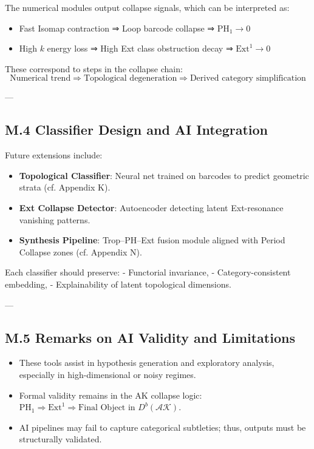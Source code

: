 \documentclass[11pt]{article}
\begin{document}
The numerical modules output collapse signals, which can be interpreted as:
\begin{itemize}
  \item Fast Isomap contraction ⇒ Loop barcode collapse ⇒ $\mathrm{PH}_1 \to 0$
  \item High $k$ energy loss ⇒ High Ext class obstruction decay ⇒ $\mathrm{Ext}^1 \to 0$
\end{itemize}

These correspond to steps in the collapse chain:
\[
\text{Numerical trend} \Rightarrow \text{Topological degeneration} \Rightarrow \text{Derived category simplification}
\]

---

\subsection*{M.4 Classifier Design and AI Integration}

Future extensions include:
\begin{itemize}
  \item \textbf{Topological Classifier}: Neural net trained on barcodes to predict geometric strata (cf. Appendix K).
  \item \textbf{Ext Collapse Detector}: Autoencoder detecting latent Ext-resonance vanishing patterns.
  \item \textbf{Synthesis Pipeline}: Trop–PH–Ext fusion module aligned with Period Collapse zones (cf. Appendix N).
\end{itemize}

Each classifier should preserve:
- Functorial invariance,
- Category-consistent embedding,
- Explainability of latent topological dimensions.

---

\subsection*{M.5 Remarks on AI Validity and Limitations}

\begin{itemize}
  \item These tools assist in hypothesis generation and exploratory analysis, especially in high-dimensional or noisy regimes.
  \item Formal validity remains in the AK collapse logic: $\mathrm{PH}_1 \Rightarrow \mathrm{Ext}^1 \Rightarrow \text{Final Object in } D^b(\mathcal{AK})$.
  \item AI pipelines may fail to capture categorical subtleties; thus, outputs must be structurally validated.
\end{itemize}
\end{document}
